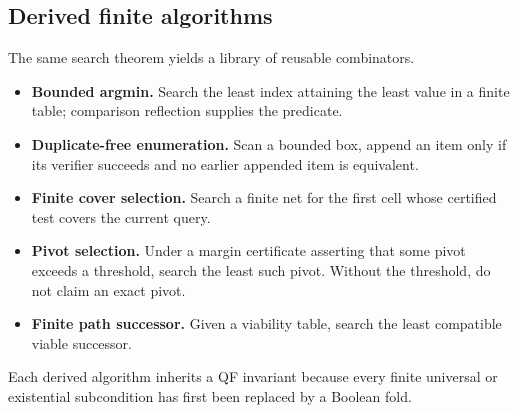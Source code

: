 \subsection{Derived finite algorithms}

The same search theorem yields a library of reusable combinators.
\begin{itemize}
  \item \textbf{Bounded argmin.}  Search the least index attaining the least value in a finite table; comparison reflection supplies the predicate.
  \item \textbf{Duplicate-free enumeration.}  Scan a bounded box, append an item only if its verifier succeeds and no earlier appended item is equivalent.
  \item \textbf{Finite cover selection.}  Search a finite net for the first cell whose certified test covers the current query.
  \item \textbf{Pivot selection.}  Under a margin certificate asserting that some pivot exceeds a threshold, search the least such pivot.  Without the threshold, do not claim an exact pivot.
  \item \textbf{Finite path successor.}  Given a viability table, search the least compatible viable successor.
\end{itemize}
Each derived algorithm inherits a QF invariant because every finite universal or existential subcondition has first been replaced by a Boolean fold.
